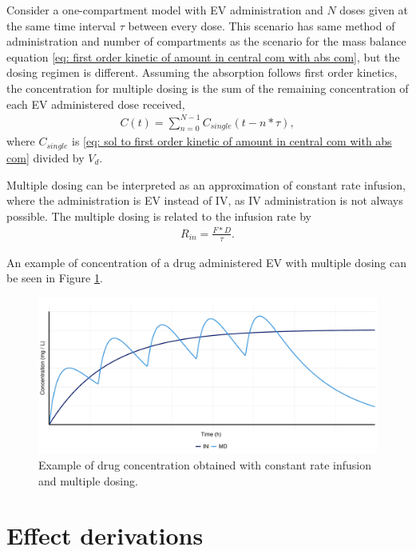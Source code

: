 Consider a one-compartment model with EV administration and $N$ doses given at the same time interval $\tau$ between every dose. This scenario has same method of administration and number of compartments as the scenario for the mass balance equation \eqref{eq: first order kinetic of amount in central com with abs com}, but the dosing regimen is different. Assuming the absorption follows first order kinetics, the concentration for multiple dosing is the sum of the remaining concentration of each EV administered dose received, 
\begin{align*}
    C(t) = \sum^{N-1}_{n=0} C_{single}(t-n*\tau),
\end{align*}
where $C_{single}$ is \eqref{eq: sol to first order kinetic of amount in central com with abs com} divided by $V_d$.

Multiple dosing can be interpreted as an approximation of constant rate infusion, where the administration is EV instead of IV, as IV administration is not always possible. The multiple dosing is related to the infusion rate by
\begin{align*}
    R_{in} = \frac{F * D}{\tau}.
\end{align*}

An example of concentration of a drug administered EV with multiple dosing can be seen in Figure \ref{fig: IN and MD}.
\begin{figure}[H]
    \centering
    \includegraphics[width=0.9\linewidth]{fig/img/Exposure and Css/3hoursDosing.pdf}
    \caption{Example of drug concentration obtained with constant rate infusion and multiple dosing.}
    \label{fig: IN and MD}
\end{figure}



\section{Effect derivations}


